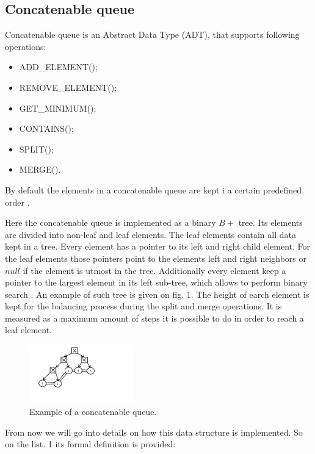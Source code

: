 \documentclass[conference]{IEEEtran}
\theoremstyle{plane}
\begin{document}
\subsection{Concatenable queue}

Concatenable queue is an Abstract Data Type (ADT), that supports following operations:

\begin{itemize}
	\item
	ADD\_ELEMENT();
	\item
	REMOVE\_ELEMENT();
	\item
	GET\_MINIMUM();
	\item
	CONTAINS();
	\item
	SPLIT();
	\item
	MERGE().
\end{itemize}

By default the elements in a concatenable queue are kept i a certain predefined order \cite{aho}.

Here the concatenable queue is implemented as a binary  $B+$ tree. Its elements are divided into non-leaf and leaf elements. The leaf elements contain all data kept in a tree. Every element has a pointer to its left and right child element. For the leaf elements those pointers point to the elements left and right neighbors or $null$ if the element is utmost in the tree. 
Additionally every element keep a pointer to the largest element in its left sub-tree, which  allows to perform binary search \cite{aho}.  An example of such tree is given on fig. 1. The height of earch element is kept for the balancing process during the split and merge operations. It is measured as a maximum amount of steps it is possible to do in order to reach a leaf element.

\begin{figure}[htbp]
	\centerline{\includegraphics[width=0.4\textwidth, height=0.2\textheight]{cq_example}}
	\caption{Example of a concatenable queue.}
	\label{cq_example}
\end{figure}

From now we will go into details on how this data structure is implemented. So on the list. 1 its formal definition is provided:
\end{document}
